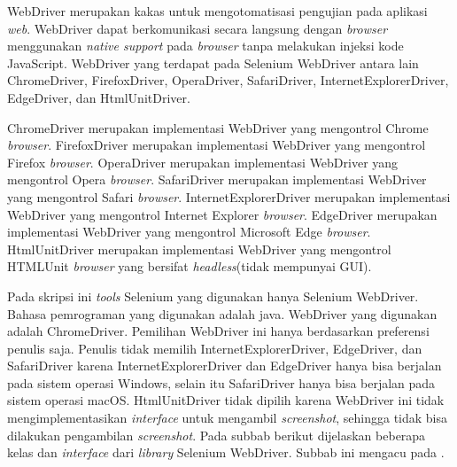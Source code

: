 WebDriver merupakan kakas untuk mengotomatisasi pengujian pada aplikasi \textit{web}\cite{Selenium_doc}. WebDriver dapat berkomunikasi secara langsung dengan \textit{browser} menggunakan \textit{native support} pada \textit{browser} tanpa melakukan injeksi kode JavaScript. WebDriver yang terdapat pada Selenium WebDriver antara lain ChromeDriver, FirefoxDriver, OperaDriver, SafariDriver, InternetExplorerDriver, EdgeDriver, dan HtmlUnitDriver.

ChromeDriver merupakan implementasi WebDriver yang mengontrol Chrome \textit{browser}. FirefoxDriver merupakan implementasi WebDriver yang mengontrol Firefox \textit{browser}. OperaDriver merupakan implementasi WebDriver yang mengontrol Opera \textit{browser}. SafariDriver merupakan implementasi WebDriver yang mengontrol Safari \textit{browser}. InternetExplorerDriver merupakan implementasi WebDriver yang mengontrol Internet Explorer \textit{browser}. EdgeDriver merupakan implementasi WebDriver yang mengontrol Microsoft Edge \textit{browser}. HtmlUnitDriver merupakan implementasi WebDriver yang mengontrol HTMLUnit \textit{browser} yang bersifat \textit{headless}(tidak mempunyai GUI). 

Pada skripsi ini \textit{tools} Selenium yang digunakan hanya Selenium WebDriver. Bahasa pemrograman yang digunakan adalah java. WebDriver yang digunakan adalah ChromeDriver. Pemilihan WebDriver ini hanya berdasarkan preferensi penulis saja. Penulis tidak memilih InternetExplorerDriver, EdgeDriver, dan SafariDriver karena InternetExplorerDriver dan EdgeDriver hanya bisa berjalan pada sistem operasi Windows, selain itu SafariDriver hanya bisa berjalan pada sistem operasi macOS. HtmlUnitDriver tidak dipilih karena WebDriver ini tidak mengimplementasikan \textit{interface} untuk mengambil \textit{screenshot}, sehingga tidak bisa dilakukan pengambilan \textit{screenshot}. Pada subbab berikut dijelaskan beberapa kelas dan \textit{interface} dari \textit{library} Selenium WebDriver. Subbab ini mengacu pada \cite{Selenium_java_doc}.

